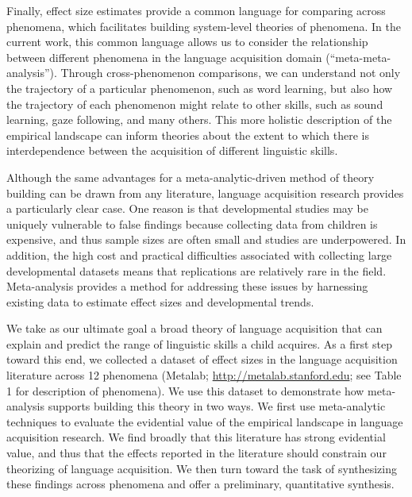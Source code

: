 \documentclass[english,floatsintext,man]{apa6}
\theoremstyle{definition}
\theoremstyle{definition}
\theoremstyle{remark}
\begin{document}
Finally, effect size estimates provide a common language for comparing
across phenomena, which facilitates building system-level theories of
phenomena. In the current work, this common language allows us to
consider the relationship between different phenomena in the language
acquisition domain (\enquote{meta-meta-analysis}). Through
cross-phenomenon comparisons, we can understand not only the trajectory
of a particular phenomenon, such as word learning, but also how the
trajectory of each phenomenon might relate to other skills, such as
sound learning, gaze following, and many others. This more holistic
description of the empirical landscape can inform theories about the
extent to which there is interdependence between the acquisition of
different linguistic skills.

Although the same advantages for a meta-analytic-driven method of theory
building can be drawn from any literature, language acquisition research
provides a particularly clear case. One reason is that developmental
studies may be uniquely vulnerable to false findings because collecting
data from children is expensive, and thus sample sizes are often small
and studies are underpowered. In addition, the high cost and practical
difficulties associated with collecting large developmental datasets
means that replications are relatively rare in the field. Meta-analysis
provides a method for addressing these issues by harnessing existing
data to estimate effect sizes and developmental trends.

We take as our ultimate goal a broad theory of language acquisition that
can explain and predict the range of linguistic skills a child acquires.
As a first step toward this end, we collected a dataset of effect sizes
in the language acquisition literature across 12 phenomena (Metalab;
\url{http://metalab.stanford.edu}; see Table 1 for description of
phenomena). We use this dataset to demonstrate how meta-analysis
supports building this theory in two ways. We first use meta-analytic
techniques to evaluate the evidential value of the empirical landscape
in language acquisition research. We find broadly that this literature
has strong evidential value, and thus that the effects reported in the
literature should constrain our theorizing of language acquisition. We
then turn toward the task of synthesizing these findings across
phenomena and offer a preliminary, quantitative synthesis.

\renewcommand{\arraystretch}{1.5}
\end{document}
